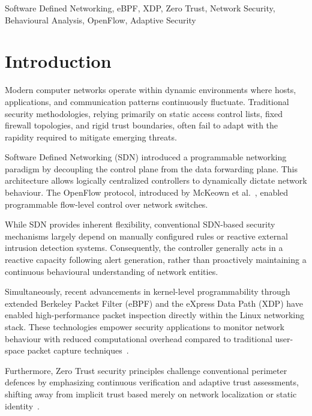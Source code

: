 \documentclass[conference]{IEEEtran}
\begin{document}
\begin{IEEEkeywords}
Software Defined Networking, eBPF, XDP, Zero Trust,
Network Security, Behavioural Analysis, OpenFlow,
Adaptive Security
\end{IEEEkeywords}


\section{Introduction}

Modern computer networks operate within dynamic environments where hosts, applications, and communication patterns continuously fluctuate. Traditional security methodologies, relying primarily on static access control lists, fixed firewall topologies, and rigid trust boundaries, often fail to adapt with the rapidity required to mitigate emerging threats.

Software Defined Networking (SDN) introduced a programmable networking paradigm by decoupling the control plane from the data forwarding plane. This architecture allows logically centralized controllers to dynamically dictate network behaviour. The OpenFlow protocol, introduced by McKeown et al.~\cite{mckeown2008openflow}, enabled programmable flow-level control over network switches.

While SDN provides inherent flexibility, conventional SDN-based security mechanisms largely depend on manually configured rules or reactive external intrusion detection systems. Consequently, the controller generally acts in a reactive capacity following alert generation, rather than proactively maintaining a continuous behavioural understanding of network entities.

Simultaneously, recent advancements in kernel-level programmability through extended Berkeley Packet Filter (eBPF) and the eXpress Data Path (XDP) have enabled high-performance packet inspection directly within the Linux networking stack. These technologies empower security applications to monitor network behaviour with reduced computational overhead compared to traditional user-space packet capture techniques~\cite{miano2023sketching}.

Furthermore, Zero Trust security principles challenge conventional perimeter defences by emphasizing continuous verification and adaptive trust assessments, shifting away from implicit trust based merely on network localization or static identity~\cite{nist800207}.
\end{document}

